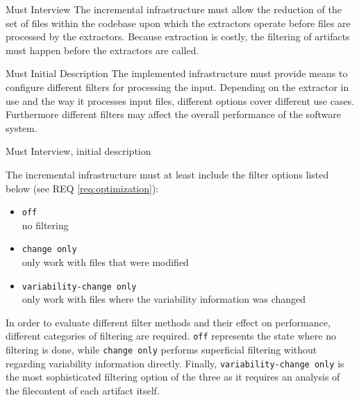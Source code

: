 \documentclass[a4paper]{article}
\begin{document}
\begin{req} \label{req:early-filtering}
\reqtable
	{Must}  {Interview}
	{The incremental infrastructure must allow the reduction of the set of files within the codebase upon which the extractors operate before files are processed by the extractors.}
	{Because extraction is costly, the filtering of artifacts must happen before the extractors are called.}
\vspace{1em}

\clearpage
\begin{subreq} \label{req:optimization}
\reqtable
	{Must}  {Initial Description}
	{
	The implemented infrastructure must provide means to configure different filters for processing the input.
    }
	{Depending on the extractor in use and the way it processes input files, different options cover different use cases. Furthermore different filters may affect the overall performance of the software system.}
\end{subreq}
\vspace{1em}

\begin{subreq}\label{req:mandatory-filters}
    \reqtable
	{Must}  {Interview, initial description}
	{
	The incremental infrastructure must at least include the filter options listed below (see REQ \ref{req:optimization}):
	\begin{itemize}
		\item \texttt{off} \\
		no filtering 
	    \item \texttt{change only} \\
	    only work with files that were modified
	    \item \texttt{variability-change only} \\
	     only work with files where the variability information was changed
	\end{itemize}
    }
	{In order to evaluate different filter methods and their effect on performance, different categories of filtering are required. \texttt{off} represents the state where no filtering is done, while \texttt{change only} performs superficial filtering without regarding variability information directly. Finally, \texttt{variability-change only} is the most sophisticated filtering option of the three as it requires an analysis of the filecontent of each artifact itself.}
\end{subreq}
\vspace{1em}


\end{req}
\end{document}

